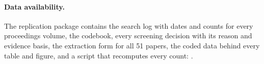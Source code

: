 \paragraph{Data availability.} The replication package contains the search log with dates and counts for every proceedings volume, the codebook, every screening decision with its reason and evidence basis, the extraction form for all 51 papers, the coded data behind every table and figure, and a script that recomputes every count: .
